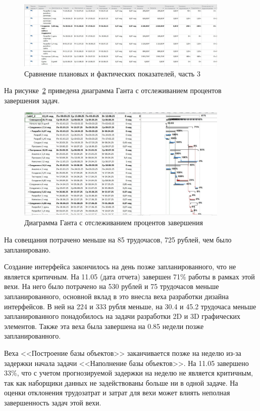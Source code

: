\begin{figure}[H]
	\centering
	\includegraphics[width=0.9\textwidth]{img/screen28.jpg}
	\caption{Сравнение плановых и фактических показателей, часть 3}
	\label{fig:screen28}
\end{figure}

На рисунке~\ref{fig:screen35} приведена диаграмма Ганта с отслеживанием процентов завершения задач.

\begin{figure}[H]
	\centering
	\includegraphics[width=0.9\textwidth]{img/screen35.jpg}
	\caption{Диаграмма Ганта с отслеживанием процентов завершения}
	\label{fig:screen35}
\end{figure}

На совещания потрачено меньше на 85 трудочасов, 725 рублей, чем было запланировано.

Создание интерфейса закончилось на день позже запланированного, что не является критичным.
На 11.05 (дата отчета) завершен 71\% работы в рамках этой вехи.
На него было потрачено на 530 рублей и 75 трудочасов меньше запланированного, основной вклад в это внесла веха разработки дизайна интерфейсов.
В ней на 224 и 333 рубля меньше, на 30.4 и 45.2 трудочаса меньше запланированного понадобилось на задачи разработки 2D и 3D графических элементов.
Также эта веха была завершена на 0.85 недели позже запланированного.

Веха <<Построение базы объектов>> заканчивается позже на неделю из-за задержки начала задачи <<Наполнение базы объектов>>.
На 11.05 завершено 33\%, что с учетом прогнозируемой задержки на неделю не является критичным, так как наборщики данных не задействованы больше ни в одной задаче.
На оценки отклонения трудозатрат и затрат для вехи может влиять неполная завершенность задач этой вехи.

